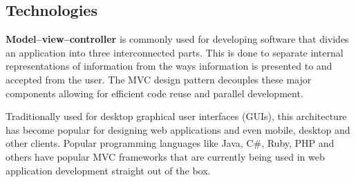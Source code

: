 \documentclass[12pt,a4paper,titlepage]{article}
\begin{document}
\subsection{Technologies}
\textbf{Model–view–controller} is commonly used for developing software that divides an application into three interconnected parts. This is done to separate internal representations of information from the ways information is presented to and accepted from the user. The MVC design pattern decouples these major components allowing for efficient code reuse and parallel development.\par
Traditionally used for desktop graphical user interfaces (GUIs), this architecture has become popular for designing web applications and even mobile, desktop and other clients. Popular programming languages like Java, C\#, Ruby, PHP and others have popular MVC frameworks that are currently being used in web application development straight out of the box.\par
\end{document}
